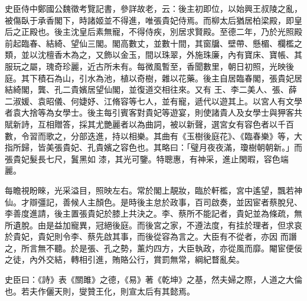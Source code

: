 \begin{pinyinscope}
 史臣侍中鄭國公魏徵考覽記書，參詳故老，云：後主初即位，以始興王叔陵之亂，被傷臥于承香閣下，時諸姬並不得進，唯張貴妃侍焉。而柳太后猶居柏梁殿，即皇
 后之正殿也。後主沈皇后素無寵，不得侍疾，別居求賢殿。至德二年，乃於光照殿前起臨春、結綺、望仙三閣。閣高數丈，並數十間，其窗牖、壁帶、懸楣、欄檻之類，並以沈檀香木為之，又飾以金玉，間以珠翠，外施珠廉，內有寶床、寶帳、其服玩之屬，瑰奇珍麗，近古所未有。每微風暫至，香聞數里，朝日初照，光映後庭。其下積石為山，引水為池，植以奇樹，雜以花藥。後主自居臨春閣，張貴妃居結綺閣，龔、孔二貴嬪居望仙閣，並復道交相往來。又有
 王、李二美人、張、薛二淑媛、袁昭儀、何婕妤、江脩容等七人，並有寵，遞代以遊其上。以宮人有文學者袁大捨等為女學士。後主每引賓客對貴妃等遊宴，則使諸貴人及女學士與狎客共賦新詩，互相贈答，採其尤艷麗者以為曲詞，被以新聲，選宮女有容色者以千百數，令習而歌之，分部迭進，持以相樂。其曲有《玉樹後庭花》、《臨春樂》等，大指所歸，皆美張貴妃、孔貴嬪之容色也。其略曰：「璧月夜夜滿，瓊樹朝朝新。」而張貴妃髮長七尺，鬒黑如
 漆，其光可鑒。特聰惠，有神采，進止閑暇，容色端麗。



 每瞻視盼睞，光采溢目，照映左右。常於閣上靚妝，臨於軒檻，宮中遙望，飄若神仙。才辯彊記，善候人主顏色。是時後主怠於政事，百司啟奏，並因宦者蔡脫兒、李善度進請，後主置張貴妃於膝上共決之。李、蔡所不能記者，貴妃並為條疏，無所遺脫。由是益加寵異，冠絕後庭。而後宮之家，不遵法度，有挂於理者，但求哀於貴妃，貴妃則令李、蔡先啟其事，而後從容為言之。大臣有不從者，亦因
 而譖之，所言無不聽。於是張、孔之勢，薰灼四方，大臣執政，亦從風而靡。閹宦便佞之徒，內外交結，轉相引進，賄賂公行，賞罰無常，綱紀瞀亂矣。



 史臣曰：《詩》表《關雎》之德，《易》著《乾坤》之基，然夫婦之際，人道之大倫也。若夫作儷天則，燮贊王化，則宣太后有其懿焉。



\end{pinyinscope}